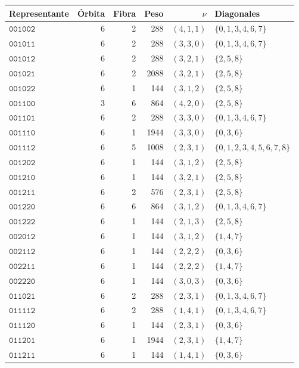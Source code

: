 \begin{table}[!htbp]
\centering\fontsize{8.8}{10.1}\selectfont
\setlength{\tabcolsep}{4pt}\renewcommand{\arraystretch}{1.04}
\begin{tabular}{@{}lrrrrl@{}}
\toprule Representante&Órbita&Fibra&Peso&\(\nu\)&Diagonales\\\midrule
\(\mathtt{001002}\)&6&2&288&\((4,1,1)\)&\(\{0,1,3,4,6,7\}\)\\
\(\mathtt{001011}\)&6&2&288&\((3,3,0)\)&\(\{0,1,3,4,6,7\}\)\\
\(\mathtt{001012}\)&6&2&288&\((3,2,1)\)&\(\{2,5,8\}\)\\
\(\mathtt{001021}\)&6&2&2088&\((3,2,1)\)&\(\{2,5,8\}\)\\
\(\mathtt{001022}\)&6&1&144&\((3,1,2)\)&\(\{2,5,8\}\)\\
\(\mathtt{001100}\)&3&6&864&\((4,2,0)\)&\(\{2,5,8\}\)\\
\(\mathtt{001101}\)&6&2&288&\((3,3,0)\)&\(\{0,1,3,4,6,7\}\)\\
\(\mathtt{001110}\)&6&1&1944&\((3,3,0)\)&\(\{0,3,6\}\)\\
\(\mathtt{001112}\)&6&5&1008&\((2,3,1)\)&\(\{0,1,2,3,4,5,6,7,8\}\)\\
\(\mathtt{001202}\)&6&1&144&\((3,1,2)\)&\(\{2,5,8\}\)\\
\(\mathtt{001210}\)&6&1&144&\((3,2,1)\)&\(\{2,5,8\}\)\\
\(\mathtt{001211}\)&6&2&576&\((2,3,1)\)&\(\{2,5,8\}\)\\
\(\mathtt{001220}\)&6&6&864&\((3,1,2)\)&\(\{0,1,3,4,6,7\}\)\\
\(\mathtt{001222}\)&6&1&144&\((2,1,3)\)&\(\{2,5,8\}\)\\
\(\mathtt{002012}\)&6&1&144&\((3,1,2)\)&\(\{1,4,7\}\)\\
\(\mathtt{002112}\)&6&1&144&\((2,2,2)\)&\(\{0,3,6\}\)\\
\(\mathtt{002211}\)&6&1&144&\((2,2,2)\)&\(\{1,4,7\}\)\\
\(\mathtt{002220}\)&6&1&144&\((3,0,3)\)&\(\{0,3,6\}\)\\
\(\mathtt{011021}\)&6&2&288&\((2,3,1)\)&\(\{0,1,3,4,6,7\}\)\\
\(\mathtt{011112}\)&6&2&288&\((1,4,1)\)&\(\{0,1,3,4,6,7\}\)\\
\(\mathtt{011120}\)&6&1&144&\((2,3,1)\)&\(\{0,3,6\}\)\\
\(\mathtt{011201}\)&6&1&1944&\((2,3,1)\)&\(\{1,4,7\}\)\\
\(\mathtt{011211}\)&6&1&144&\((1,4,1)\)&\(\{0,3,6\}\)\\

\end{tabular}
\end{table}
